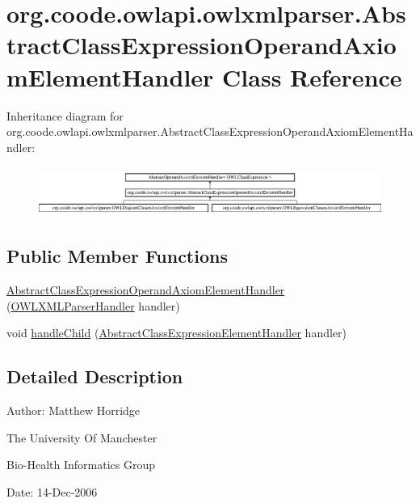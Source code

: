 \hypertarget{classorg_1_1coode_1_1owlapi_1_1owlxmlparser_1_1_abstract_class_expression_operand_axiom_element_handler}{\section{org.\-coode.\-owlapi.\-owlxmlparser.\-Abstract\-Class\-Expression\-Operand\-Axiom\-Element\-Handler Class Reference}
\label{classorg_1_1coode_1_1owlapi_1_1owlxmlparser_1_1_abstract_class_expression_operand_axiom_element_handler}
}
Inheritance diagram for org.\-coode.\-owlapi.\-owlxmlparser.\-Abstract\-Class\-Expression\-Operand\-Axiom\-Element\-Handler\-:\begin{figure}[H]
\begin{center}
\leavevmode
\includegraphics[height=1.637427cm]{classorg_1_1coode_1_1owlapi_1_1owlxmlparser_1_1_abstract_class_expression_operand_axiom_element_handler}
\end{center}
\end{figure}
\subsection*{Public Member Functions}
\begin{DoxyCompactItemize}
\item 
\hyperlink{classorg_1_1coode_1_1owlapi_1_1owlxmlparser_1_1_abstract_class_expression_operand_axiom_element_handler_a5f1c6bfa98e1c99a16cadd6672fb5c1a}{Abstract\-Class\-Expression\-Operand\-Axiom\-Element\-Handler} (\hyperlink{classorg_1_1coode_1_1owlapi_1_1owlxmlparser_1_1_o_w_l_x_m_l_parser_handler}{O\-W\-L\-X\-M\-L\-Parser\-Handler} handler)
\item 
void \hyperlink{classorg_1_1coode_1_1owlapi_1_1owlxmlparser_1_1_abstract_class_expression_operand_axiom_element_handler_a60f28f4e87b74018393b254fba6132c5}{handle\-Child} (\hyperlink{classorg_1_1coode_1_1owlapi_1_1owlxmlparser_1_1_abstract_class_expression_element_handler}{Abstract\-Class\-Expression\-Element\-Handler} handler)
\end{DoxyCompactItemize}


\subsection{Detailed Description}
Author\-: Matthew Horridge\par
 The University Of Manchester\par
 Bio-\/\-Health Informatics Group\par
 Date\-: 14-\/\-Dec-\/2006\par
\par
 

